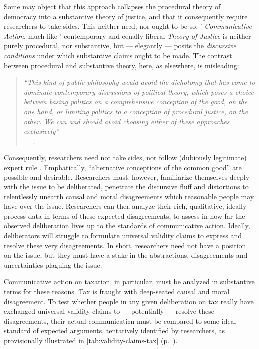 Some may object that this approach collapses the procedural theory of democracy into a substantive theory of justice, and that it consequently require researchers to take sides.
This neither need, nor ought to be so.
\citeauthor{Habermas1984}' \emph{Communicative Action}, much like \citeauthor{Rawls-1971}' contemporary and equally liberal \emph{Theory of Justice} is neither purely procedural, nor substantive, but --- elegantly --- posits the \emph{discursive conditions} under which substantive claims ought to be made.
The contrast between procedural and substantive theory, here, as elsewhere, is misleading: 
\begin{quote}
	\emph{``This kind of public philosophy would avoid the dichotomy that has come to dominate contemporary discussions of political theory, which poses a choice between basing politics on a comprehensive conception of the good, on the one hand, or limiting politics to a conception of procedural justice, on the other.
	We can and should avoid choosing either of these approaches exclusively''}\\
	--- \citep[90]{GutmannThompson-2004-aa}.
\end{quote}
Consequently, researchers need not take sides, nor follow (dubiously legitimate) expert rule \citep{Blok2007,Haas1992}.
Emphatically, ``alternative conceptions of the common good'' \citep[23]{Cohen-1989-aa} are possible and desirable.
Researchers must, however, familiarize themselves deeply with the issue to be deliberated, penetrate the discursive fluff and distortions to relentlessly unearth causal and moral disagreements which reasonable people may have over the issue.
Researchers can then analyze their rich, qualitative, ideally process data in terms of these expected disagreements, to assess in how far the observed deliberation lives up to the standards of communicative action.
Ideally, deliberators will struggle to formulate universal validity claims to express and resolve these very disagreements. 
In short, researchers need not have a position on the issue, but they must have a stake in the abstractions, disagreements and uncertainties plaguing the issue.

Communicative action on taxation, in particular, must be analyzed in substantive terms for these reasons.
Tax is fraught with deep-seated causal and moral disagreement.
To test whether people in any given deliberation on tax really have exchanged universal validity claims to --- potentially --- resolve these disagreements, their actual communication must be compared to some ideal standard of expected arguments, tentatively identified by researchers, as provisionally illustrated in \autoref{tab:validity-claims-tax} (p.~\pageref{tab:validity-claims-tax}).


